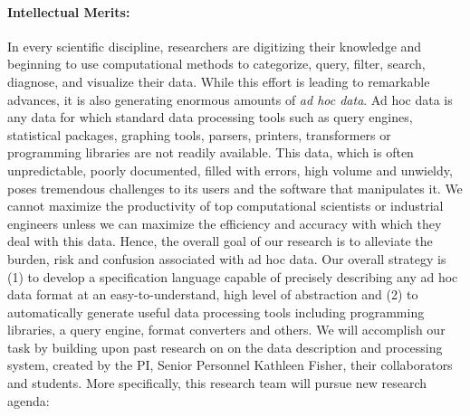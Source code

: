 
\paragraph*{Intellectual Merits:} 
In every scientific discipline, researchers are digitizing their knowledge and
beginning to use computational methods to categorize,
query, filter, search, diagnose, and visualize their data.  
While this effort is leading to remarkable advances,
it is also generating enormous amounts of {\em ad hoc data}.
Ad hoc data is any data for which standard data processing tools
such as query engines, statistical packages, graphing tools, parsers, printers,
transformers or programming libraries are not readily available.
This data, which is often unpredictable, poorly documented,
filled with errors, high volume and unwieldy,
poses tremendous challenges to its users and the software
that manipulates it.  We cannot maximize the productivity of top 
computational scientists or industrial engineers
unless we can maximize the efficiency and 
accuracy with which they deal with this data.  Hence, the overall goal of
our research is to alleviate the burden, risk and confusion
associated with ad hoc data.  Our overall strategy is (1) to develop a
specification language capable of precisely describing any ad hoc data
format at an easy-to-understand, high level of abstraction and (2) to
automatically generate useful data processing tools including
programming libraries, a query engine, format converters and others.
We will accomplish our task by building upon past research
on on the \pads{} data description and processing system, created by the 
PI, Senior Personnel Kathleen Fisher, their collaborators and students. 
More specifically, this research team will pursue new research agenda:

